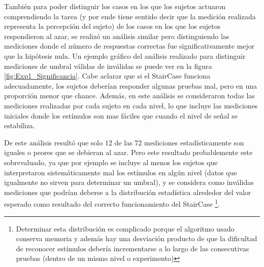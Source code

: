 \documentclass{article}
\numberwithin{figure}{section}
\begin{document}
    También para poder distinguir los casos en los que los sujetos actuaron comprendiendo la tarea (y por ende tiene sentido decir que la medición realizada representa la percepción del sujeto) de los casos en los que los sujetos respondieron al azar, se realizó un análisis similar pero distinguiendo las mediciones donde el número de respuestas correctas fue significativamente mejor que la hipótesis nula. Un ejemplo gráfico del análisis realizado para distinguir mediciones de umbral válidas de inválidas se puede ver en la figura \ref{fig:Exp1_Significancia}. Cabe aclarar que si el StairCase funciona adecuadamente, los sujetos deberían responder algunas pruebas mal, pero en una proporción menor que chance. Además, en este análisis se consideraron todas las mediciones realizadas por cada sujeto en cada nivel, lo que incluye las mediciones iniciales donde los estímulos son mas fáciles que cuando el nivel de señal se estabiliza. 
    
    De este análisis resultó que solo 12 de las 72 mediciones estadísticamente son iguales o peores que se debieran al azar. Pero este resultado probablemente este sobrevaluado, ya que por ejemplo se incluye al menos los sujetos que interpretaron sistemáticamente mal los estímulos en algún nivel (datos que igualmente no sirven para determinar un umbral), y se considera como inválidas mediciones que podrían deberse a la distribución estadística alrededor del valor esperado como resultado del correcto funcionamiento del StairCase \footnote{Determinar esta distribución es complicado porque el algoritmo usado conserva memoria y además hay una desviación producto de que la dificultad de reconocer estímulos debería incrementarse a lo largo de las consecutivas pruebas (dentro de un mismo nivel o experimento)}.
	
	
\end{document}
